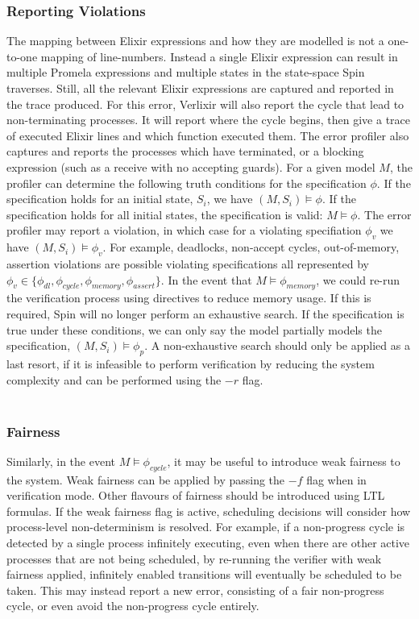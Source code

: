\subsubsection{Reporting Violations}
The mapping between Elixir expressions and how they are modelled is not a one-to-one mapping of line-numbers. Instead a single Elixir expression can result in multiple Promela expressions and multiple states in the state-space Spin traverses. Still, all the relevant Elixir expressions are captured and reported in the trace produced. For this error, Verlixir will also report the cycle that lead to non-terminating processes. It will report where the cycle begins, then give a trace of executed Elixir lines and which function executed them. The error profiler also captures and reports the processes which have terminated, or a blocking expression (such as a receive with no accepting guards). For a given model $M$, the profiler can determine the following truth conditions for the specification $\phi$. If the specification holds for an initial state, $S_i$, we have $(M, S_i) \models \phi$. If the specification holds for all initial states, the specification is valid: $M \models \phi$. The error profiler may report a violation, in which case for a violating specifiation $\phi _v$ we have $(M, S_i) \models \phi _v$. For example, deadlocks, non-accept cycles, out-of-memory, assertion violations are possible violating specifications all represented by $\phi _v \in \{\phi _{dl}, \phi _{cycle}, \phi _{memory}, \phi _{assert}\}$. In the event that $M \models \phi _{memory}$, we could re-run the verification process using directives to reduce memory usage. If this is required, Spin will no longer perform an exhaustive search. If the specification is true under these conditions, we can only say the model partially models the specification, $(M, S_i) \models \phi _p$. A non-exhaustive search should only be applied as a last resort, if it is infeasible to perform verification by reducing the system complexity and can be performed using the $-r$ flag. 
\\ \\
\subsubsection{Fairness}
Similarly, in the event $M \models \phi _{cycle}$, it may be useful to introduce weak fairness to the system. Weak fairness can be applied by passing the $-f$ flag when in verification mode. Other flavours of fairness should be introduced using LTL formulas. If the weak fairness flag is active, scheduling decisions will consider how process-level non-determinism is resolved. For example, if a non-progress cycle is detected by a single process infinitely executing, even when there are other active processes that are not being scheduled, by re-running the verifier with weak fairness applied, infinitely enabled transitions will eventually be scheduled to be taken. This may instead report a new error, consisting of a fair non-progress cycle, or even avoid the non-progress cycle entirely.  
